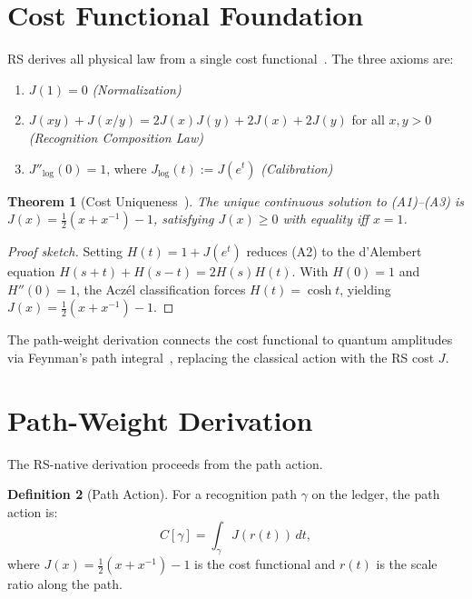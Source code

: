 \documentclass[12pt,a4paper]{article}
\newtheorem{theorem}{Theorem}[section]
\theoremstyle{definition}
\newtheorem{definition}[theorem]{Definition}
\theoremstyle{remark}
\begin{document}
\section{Cost Functional Foundation}
\label{sec:cost}

RS derives all physical law from a single cost functional~\cite{RS_Axioms}.
The three axioms are:
\begin{enumerate}[label=(A\arabic*),nosep]
  \item $J(1) = 0$ \hfill\textit{(Normalization)}
  \item $J(xy) + J(x/y) = 2J(x)J(y) + 2J(x) + 2J(y)$ for all $x, y > 0$
  \hfill\textit{(Recognition Composition Law)}
  \item $J''_{\log}(0) = 1$, where $J_{\log}(t) := J(e^t)$
  \hfill\textit{(Calibration)}
\end{enumerate}

\begin{theorem}[Cost Uniqueness~\cite{RS_Axioms}]
\label{thm:J}
The unique continuous solution to (A1)--(A3) is
$J(x) = \tfrac{1}{2}(x + x^{-1}) - 1$, satisfying $J(x) \geq 0$
with equality iff $x = 1$.
\end{theorem}

\begin{proof}[Proof sketch]
Setting $H(t) = 1 + J(e^t)$ reduces (A2) to the d'Alembert equation
$H(s+t) + H(s-t) = 2H(s)H(t)$.  With $H(0)=1$ and $H''(0)=1$,
the Acz\'el classification forces $H(t) = \cosh t$, yielding
$J(x) = \tfrac{1}{2}(x + x^{-1}) - 1$.
\end{proof}

The path-weight derivation connects the cost functional to quantum
amplitudes via Feynman's path integral~\cite{Feynman1948}, replacing
the classical action with the RS cost $J$.

\section{Path-Weight Derivation}
\label{sec:path-weight-deriv}

The RS-native derivation proceeds from the path action.

\begin{definition}[Path Action]
\label{def:pathaction}
For a recognition path $\gamma$ on the ledger, the path action
is:
\begin{equation}
  C[\gamma] = \int_\gamma J(r(t))\,dt,
\end{equation}
where $J(x) = \frac{1}{2}(x + x^{-1}) - 1$ is the cost
functional and $r(t)$ is the scale ratio along the path.
\end{definition}
\end{document}
